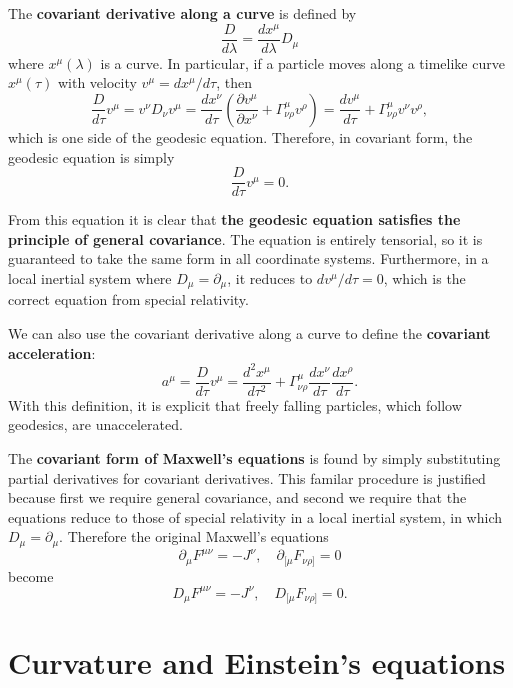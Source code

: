 \documentclass[11pt]{article}
\begin{document}
The \textbf{covariant derivative along a curve} is defined by
$$ \frac{D}{d\lambda} = \frac{dx^\mu}{d\lambda} D_\mu $$
where $x^\mu (\lambda)$ is a curve.
In particular, if a particle moves along a timelike curve $x^\mu(\tau)$ with velocity $v^\mu = dx^\mu/d\tau$, then
$$ \frac{D}{d\tau} v^\mu = v^\nu D_\nu v^\mu = \frac{dx^\nu}{d\tau} \left( \frac{\partial v^\mu}{\partial x^\nu} + \Gamma^\mu_{\nu \rho} v^\rho \right) = \frac{d v^\mu}{d \tau} + \Gamma^\mu_{\nu \rho} v^\nu v^\rho, $$
which is one side of the geodesic equation.
Therefore, in covariant form, the geodesic equation is simply
$$ \frac{D}{d\tau} v^\mu = 0. $$

From this equation it is clear that \textbf{the geodesic equation satisfies the principle of general covariance}.
The equation is entirely tensorial, so it is guaranteed to take the same form in all coordinate systems.
Furthermore, in a local inertial system where $D_\mu = \partial_\mu$, it reduces to $dv^\mu/d\tau = 0$, which is the correct equation from special relativity.

We can also use the covariant derivative along a curve to define the \textbf{covariant acceleration}:
$$ a^\mu = \frac{D}{d\tau} v^\mu = \frac{d^2 x^\mu}{d \tau^2} + \Gamma^\mu_{\nu \rho} \frac{dx^\nu}{d\tau} \frac{dx^\rho}{d\tau}. $$
With this definition, it is explicit that freely falling particles, which follow geodesics, are unaccelerated.

The \textbf{covariant form of Maxwell's equations} is found by simply substituting partial derivatives for covariant derivatives.
This familar procedure is justified because first we require general covariance, and second we require that the equations reduce to those of special relativity in a local inertial system, in which $D_\mu = \partial_\mu$.
Therefore the original Maxwell's equations
$$ \partial_\mu F^{\mu \nu} = -J^\nu, \quad \partial_{[\mu}F_{\nu \rho]} = 0 $$
become
$$ D_\mu F^{\mu \nu} = -J^\nu, \quad D_{[\mu}F_{\nu \rho]} = 0. $$

\section{Curvature and Einstein's equations}
\end{document}
